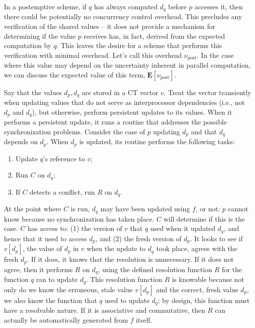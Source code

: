 \documentclass[pageno]{jpaper}
\newcommand{\Ev}{\mathbf{E}}
\begin{document}
In a postemptive scheme, if $q$ has always computed $d_q$ before $p$ accesses
it, then there could be potentially no concurrency control overhead. This
precludes any verification of the shared values -- it does not provide a
mechanism for determining if the value $p$ receives has, in fact, derived from
the expected computation by $q$. This leaves the desire for a scheme that
performs this verification with minimal overhead. Let's call this overhead
$\nu_\text{post}$. In the case where this value may depend on the uncertainty
inherent in parallel computation, we can discuss the expected value of this
term, $\Ev[\nu_\text{post}]$.

Say that the values $d_p, d_q$ are stored in a CT vector $v$. Treat the vector
transiently when updating values that do not serve as interprocessor
dependencies (i.e., not $d_p$ and $d_q$), but otherwise, perform persistent
updates to its values. When it performs a persistent update, it runs a routine
that addresses the possible synchronization problems.  Consider the case of $p$
updating $d_p$ and that $d_q$ depends on $d_p$. When $d_p$ is updated, its
routine performs the following tasks:
\begin{enumerate}
    \item Update $q$'s reference to $v$;
    \item Run $C$ on $d_q$;
    \item If $C$ detects a conflict, run $R$ on $d_q$.
\end{enumerate}

At the point where $C$ is run, $d_q$ may have been updated using $f$, or not:
$p$ cannot know because no synchronization has taken place. $C$ will determine
if this is the case. $C$ has access to: (1) the version of $v$ that $q$ used
when it updated $d_q$, and hence that it used to access $d_p$, and (2) the fresh
version of $d_p$. It looks to see if $v[d_p]$, the value of $d_p$ in $v$ when
the update to $d_q$ took place, agrees with the fresh $d_p$. If it does, it
knows that the resolution is unnecessary. If it does not agree, then it performs
$R$ on $d_q$, using the defined resolution function $R$ for the function $q$ ran
to update $d_q$. This resolution function $R$ is knowable because not only do we
know the erroneous, stale value $v[d_p]$ and the correct, fresh value $d_p$, we
also know the function that $q$ used to update $d_q$; by design, this function
must have a resolvable nature. If it is associative and commutative, then $R$
can actually be automatically generated from $f$ itself.
\end{document}
